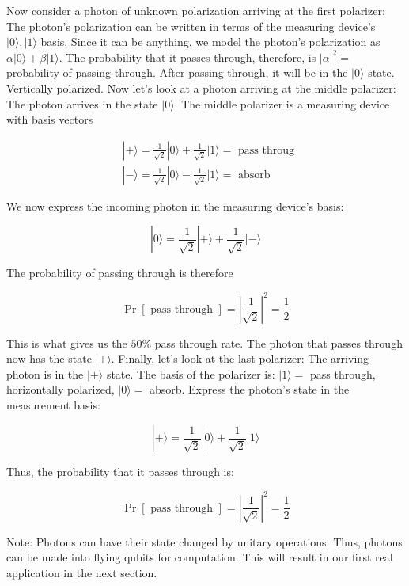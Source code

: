 \documentclass[main.tex]{subfiles}
\begin{document}
    Now consider a photon of unknown polarization arriving at the first polarizer: The photon's polarization can be written in terms of the measuring device's $|0\rangle,|1\rangle$ basis. Since it can be anything, we model the photon's polarization as $\alpha|0\rangle+\beta|1\rangle$. The probability that it passes through, therefore, is $|\alpha|^{2}=$ probability of passing through. After passing through, it will be in the $|0\rangle$ state. Vertically polarized. Now let's look at a photon arriving at the middle polarizer: The photon arrives in the state $|0\rangle$. The middle polarizer is a measuring device with basis vectors
    
    $$
    \begin{aligned}
    &|+\rangle=\frac{1}{\sqrt{2}}|0\rangle+\frac{1}{\sqrt{2}}|1\rangle=\text { pass throug } \\
    &|-\rangle=\frac{1}{\sqrt{2}}|0\rangle-\frac{1}{\sqrt{2}}|1\rangle=\text { absorb }
    \end{aligned}
    $$
    
    We now express the incoming photon in the measuring device's basis:
    
    $$
    |0\rangle=\frac{1}{\sqrt{2}}|+\rangle+\frac{1}{\sqrt{2}}|-\rangle
    $$
    
    The probability of passing through is therefore
    
    $$
    \operatorname{Pr}[\text { pass through }]=\left|\frac{1}{\sqrt{2}}\right|^{2}=\frac{1}{2}
    $$
    
    This is what gives us the $50 \%$ pass through rate. The photon that passes through now has the state $|+\rangle$. Finally, let's look at the last polarizer: The arriving photon is in the $|+\rangle$ state. The basis of the polarizer is: $|1\rangle=$ pass through, horizontally polarized, $|0\rangle=$ absorb. Express the photon's state in the measurement basis:
    
    $$
    |+\rangle=\frac{1}{\sqrt{2}}|0\rangle+\frac{1}{\sqrt{2}}|1\rangle
    $$
    
    Thus, the probability that it passes through is:
    
    $$
    \operatorname{Pr}[\text { pass through }]=\left|\frac{1}{\sqrt{2}}\right|^{2}=\frac{1}{2}
    $$
    
    Note: Photons can have their state changed by unitary operations. Thus, photons can be made into flying qubits for computation. This will result in our first real application in the next section.
\end{document}
